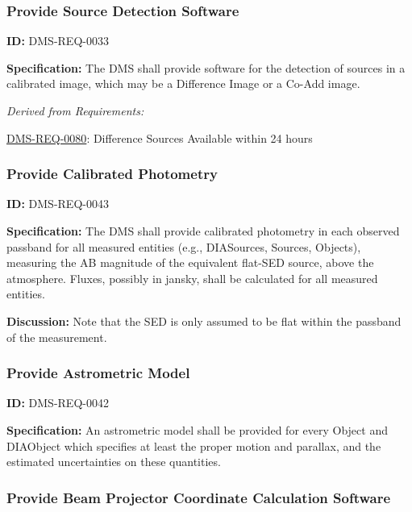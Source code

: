 \documentclass[SE,toc,lsstdraft]{lsstdoc}
\begin{document}
\subsubsection{Provide Source Detection Software}

\label{DMS-REQ-0033}
\textbf{ID:} DMS-REQ-0033

\textbf{Specification:} The DMS shall provide software for the detection of sources in a calibrated image, which may be a Difference Image or a Co-Add image.






\emph{Derived from Requirements:}

\hyperref[DMS-REQ-0080]{DMS-REQ-0080}:
Difference Sources Available within 24 hours \newline


\subsubsection{Provide Calibrated Photometry}

\label{DMS-REQ-0043}
\textbf{ID:} DMS-REQ-0043

\textbf{Specification:} The DMS shall provide calibrated photometry in each observed passband for all measured entities (e.g., DIASources, Sources, Objects), measuring the AB magnitude of the equivalent flat-SED source, above the atmosphere. Fluxes, possibly in jansky, shall be calculated for all measured entities.

\textbf{Discussion: }Note that the SED is only assumed to be flat within the passband of the measurement.




\subsubsection{Provide Astrometric Model}

\label{DMS-REQ-0042}
\textbf{ID:} DMS-REQ-0042

\textbf{Specification:} An astrometric model shall be provided for every Object and DIAObject which specifies at least the proper motion and parallax, and the estimated uncertainties on these quantities.






\subsubsection{Provide Beam Projector Coordinate Calculation Software}
\end{document}
